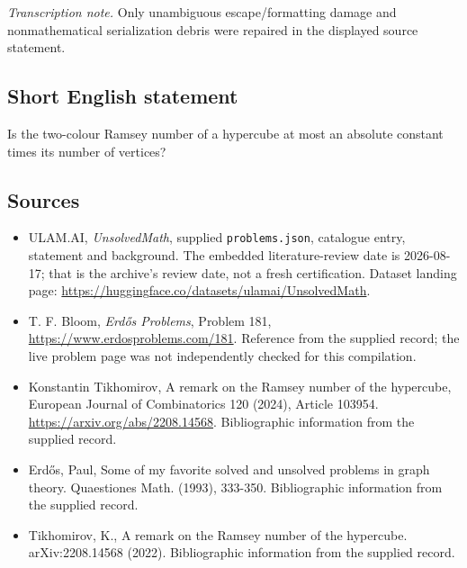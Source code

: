 \documentclass[11pt,a4paper]{article}
\begin{document}
{\small\emph{Transcription note.} Only unambiguous escape/formatting damage and nonmathematical serialization debris were repaired in the displayed source statement.}

\subsection{Short English statement}

Is the two-colour Ramsey number of a hypercube at most an absolute constant times its number of vertices?

\subsection{Sources}

{\small

\begin{itemize}

\item[\hypertarget{source:statement:1}{S1}] ULAM.AI, \emph{UnsolvedMath}, supplied \texttt{problems.json}, catalogue entry, statement and background. The embedded literature-review date is 2026-08-17; that is the archive’s review date, not a fresh certification. Dataset landing page: \url{https://huggingface.co/datasets/ulamai/UnsolvedMath}.

\item[\hypertarget{source:statement:2}{S2}] T. F. Bloom, \emph{Erdős Problems}, Problem 181, \url{https://www.erdosproblems.com/181}. Reference from the supplied record; the live problem page was not independently checked for this compilation.

\item[\hypertarget{source:statement:3}{S3}] Konstantin Tikhomirov, A remark on the Ramsey number of the hypercube, European Journal of Combinatorics 120 (2024), Article 103954. \url{https://arxiv.org/abs/2208.14568}. Bibliographic information from the supplied record.

\item[\hypertarget{source:statement:4}{S4}] Erd\H{o}s, Paul, Some of my favorite solved and unsolved problems in graph theory. Quaestiones Math. (1993), 333-350. Bibliographic information from the supplied record.

\item[\hypertarget{source:statement:5}{S5}] Tikhomirov, K., A remark on the Ramsey number of the hypercube. arXiv:2208.14568 (2022). Bibliographic information from the supplied record.

\end{itemize}

}

\label{end:statement}
\end{document}
